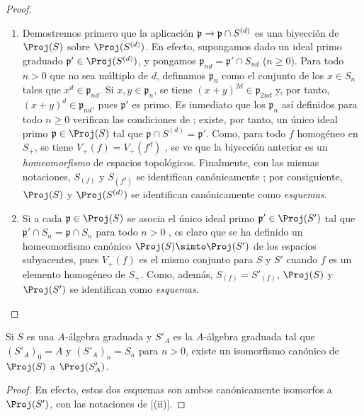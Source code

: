 \documentclass[oneside,10pt]{amsart}
\makeatletter
\renewcommand{\geq}{\geqslant}
\newcommand{\ega@arrow}[2]{\mathchoice{#1}{#2}{#2}{#2}}
\renewcommand{\to}{\ega@arrow{\longrightarrow}{\rightarrow}}
\let\EGAOriginalLabel\label
\renewcommand{\label}[1]{\phantomsection\EGAOriginalLabel{#1}}
\makeatother
\begin{document}
\begin{proof}
\medskip\noindent
\begin{enumerate}
  \item[\rm(i)] Demostremos primero que la aplicación $\mathfrak{p}\to\mathfrak{p}\cap S^{(d)}$ es una biyección de $\Proj(S)$ sobre $\Proj(S^{(d)})$.
  En efecto, supongamos dado un ideal primo graduado $\mathfrak{p}'\in\Proj(S^{(d)})$, y pongamos $\mathfrak{p}_{nd}=\mathfrak{p}'\cap S_{nd}$ ($n\geq0$).
  Para todo $n>0$ que no sea múltiplo de $d$, definamos $\mathfrak{p}_n$ como el conjunto de los $x\in S_n$ tales que $x^d\in\mathfrak{p}_{nd}$.
  Si $x,y\in\mathfrak{p}_n$, se tiene $(x+y)^{2d}\in\mathfrak{p}_{2nd}$ y, por tanto, $(x+y)^d\in\mathfrak{p}_{nd}$, pues $\mathfrak{p}'$ es primo.
  Es inmediato que los $\mathfrak{p}_n$ así definidos para todo $n\geq0$ verifican las condiciones de ; existe, por tanto, un único ideal primo $\mathfrak{p}\in\Proj(S)$ tal que $\mathfrak{p}\cap S^{(d)}=\mathfrak{p}'$.
  Como, para todo $f$ homogéneo en $S_+$, se tiene $V_+(f)=V_+(f^d)$ , se ve que la biyección anterior es un \emph{homeomorfismo} de espacios topológicos.
  Finalmente, con las mismas notaciones, $S_{(f)}$ y $S_{(f^d)}$ se identifican canónicamente ; por consiguiente, $\Proj(S)$ y $\Proj(S^{(d)})$ se identifican canónicamente como \emph{esquemas}.
  \item[\rm(ii)] Si a cada $\mathfrak{p}\in\Proj(S)$ se asocia el único ideal primo $\mathfrak{p}'\in\Proj(S')$ tal que $\mathfrak{p}'\cap S_n=\mathfrak{p}\cap S_n$ para todo $n>0$ , es claro que se ha definido un homeomorfismo canónico $\Proj(S)\simto\Proj(S')$ de los espacios subyacentes, pues $V_+(f)$ es el mismo conjunto para $S$ y $S'$ cuando $f$ es un elemento homogéneo de $S_+$.
  Como, además, $S_{(f)}=S'_{(f)}$, $\Proj(S)$ y $\Proj(S')$ se identifican como \emph{esquemas}.
\end{enumerate}
\end{proof}

\begin{corollary}[2.4.8]
\label{II.2.4.8}
Si $S$ es una $A$-álgebra graduada y $S'_A$ es la $A$-álgebra graduada tal que $(S'_A)_0=A$ y $(S'_A)_n=S_n$ para $n>0$, existe un isomorfismo canónico de $\Proj(S)$ a $\Proj(S'_A)$.
\end{corollary}

\begin{proof}
En efecto, estos dos esquemas son ambos canónicamente isomorfos a $\Proj(S')$, con las notaciones de [(ii)].
\end{proof}
\end{document}
